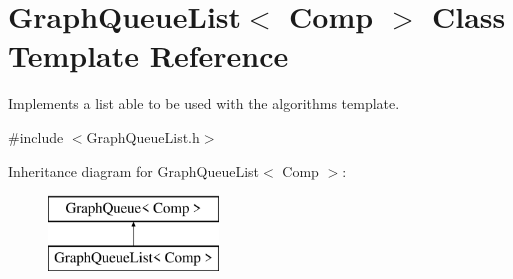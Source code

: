 \hypertarget{class_graph_queue_list}{}\section{Graph\+Queue\+List$<$ Comp $>$ Class Template Reference}
\label{class_graph_queue_list}


Implements a list able to be used with the algorithm\textquotesingle{}s template.  




{\ttfamily \#include $<$Graph\+Queue\+List.\+h$>$}

Inheritance diagram for Graph\+Queue\+List$<$ Comp $>$\+:\begin{figure}[H]
\begin{center}
\leavevmode
\includegraphics[height=2.000000cm]{class_graph_queue_list}
\end{center}
\end{figure}

